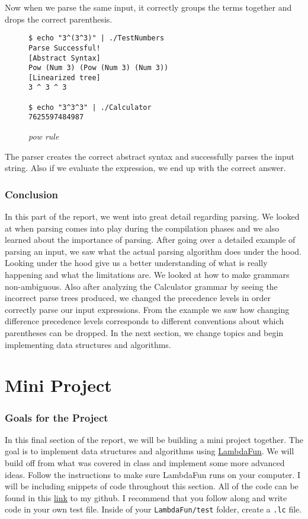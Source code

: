 \documentclass{article}
\begin{document}
\noindent
Now when we parse the same input, it correctly groups the terms together and drops the correct parenthesis. 
\begin{figure}[H]
    \begin{lstlisting}
$ echo "3^(3^3)" | ./TestNumbers 
Parse Successful!
[Abstract Syntax]
Pow (Num 3) (Pow (Num 3) (Num 3))
[Linearized tree]
3 ^ 3 ^ 3

$ echo "3^3^3" | ./Calculator 
7625597484987
    \end{lstlisting}
    \caption{\textit{pow rule}}
\end{figure}

\noindent
The parser creates the correct abstract syntax and successfully parses the input string. Also if we evaluate the expression, we end up with the correct answer.

\section{Conclusion}
In this part of the report, we went into great detail regarding parsing. We looked at when parsing comes into play during the compilation phases and we also learned about the importance of parsing. After going over a detailed example of parsing an input, we saw what the actual parsing algorithm does under the hood. Looking under the hood give us a better understanding of what is really happening and what the limitations are. We looked at how to make grammars non-ambiguous. Also after analyzing the Calculator grammar by seeing the incorrect parse trees produced, we changed the precedence levels in order correctly parse our input expressions. From the example we saw how changing difference precedence levels corresponds to different conventions about which parentheses can be dropped. In the next section, we change topics and begin implementing data structures and algorithms.


\part{Mini Project}

\section{Goals for the Project}

\medskip\noindent
In this final section of the report, we will be building a mini project together. The goal is to implement data structures and algorithms using \href{https://github.com/alexhkurz/programming-languages-2021/tree/main/Lab2-Lambda-Calculus/LambdaFun}{LambdaFun}. We will build off from what was covered in class and implement some more advanced ideas. Follow the instructions to make sure LambdaFun runs on your computer. I will be including snippets of code throughout this section. All of the code can be found in this \href{https://github.com/michaelkulinich/Programming_Languages/blob/main/report/miniProject.lc}{link} to my github. I recommend that you follow along and write code in your own test file. Inside of your \texttt{LambdaFun/test} folder, create a \texttt{.lc} file.
\end{document}
